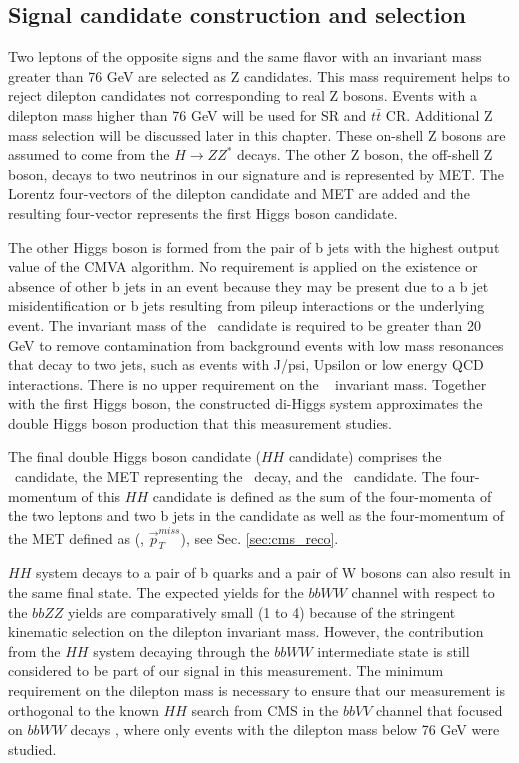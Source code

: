 \subsection{Signal candidate construction and selection}


Two leptons of the opposite signs and the same flavor with an invariant mass greater than 76 GeV are selected as Z candidates. This mass requirement helps to reject dilepton candidates not corresponding to real Z bosons. Events with a dilepton mass higher than 76 GeV will be used for SR and $t\bar{t}$ CR. Additional Z mass selection will be discussed later in this chapter. These on-shell Z bosons are assumed to come from the $H \to Z Z^*$ decays. The other Z boson, the off-shell Z boson, decays to two neutrinos in our signature and is represented by MET. The Lorentz four-vectors of the dilepton candidate and MET are added and the resulting four-vector represents the first Higgs boson candidate. 

The other Higgs boson is formed from the pair of b jets with the highest output value of the CMVA algorithm. No requirement is applied on the existence or absence of other b jets in an event because they may be present due to a b jet misidentification or b jets resulting from pileup interactions or the underlying event. The invariant mass of the \HBB~candidate is required to be greater than 20 GeV to remove contamination from background events with low mass resonances that decay to two jets, such as events with J/psi, Upsilon or low energy QCD interactions. There is no upper requirement on the \HBB~ invariant mass. Together with the first Higgs boson, the constructed di-Higgs system approximates the double Higgs boson production that this measurement studies. 

The final double Higgs boson candidate ($HH$ candidate) comprises the \Zll~candidate, the MET representing the \Znn~decay, and the \HBB~candidate. The four-momentum of this $HH$ candidate is defined as the sum of the four-momenta of the two leptons and two b jets in the candidate as well as the four-momentum of the MET defined as (\ETslash, $\vec{p}^{miss}_T$), see Sec. \ref{sec:cms_reco}.


$HH$ system decays to a pair of b quarks and a pair of W bosons can also result in the same final state. The expected yields for the $bbWW$ channel with respect to the $bbZZ$ yields are comparatively small (1 to 4) because of the stringent kinematic selection on the dilepton invariant mass. However, the contribution from the $HH$ system decaying through the $bbWW$ intermediate state is still considered to be part of our signal in this measurement. The minimum requirement on the dilepton mass is necessary to ensure that our measurement is orthogonal to the known $HH$ search from CMS in the $bbVV$ channel that focused on $bbWW$ decays \cite{bbWW}, where only events with the dilepton mass below 76 GeV were studied.

